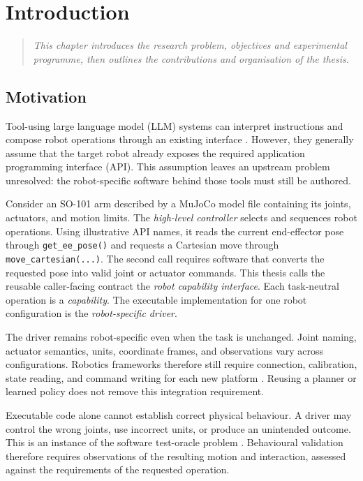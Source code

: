 \chapter[Introduction]{Introduction}\label{chapter:introduction}

\begin{quote}\itshape
This chapter introduces the research problem, objectives and experimental
programme, then outlines the contributions and organisation of the thesis.
\end{quote}

\section[Motivation]{Motivation}
\label{sec:intro-motivation}

Tool-using large language model (LLM) systems can interpret instructions and
compose robot operations through an existing interface
\citep{ahn2022saycan,liang2023codeaspolicies}. However, they generally assume
that the target robot already exposes the required application programming
interface (API). This assumption
leaves an upstream problem unresolved: the robot-specific software behind
those tools must still be authored.

Consider an SO-101 arm described by a MuJoCo model file containing its joints,
actuators, and motion limits. The \emph{high-level controller} selects and
sequences robot operations. Using illustrative API names, it reads the current
end-effector pose through \texttt{get\_ee\_pose()} and requests a Cartesian move
through \texttt{move\_cartesian(...)}. The second call requires software that
converts the requested pose into valid joint or actuator commands. This thesis
calls the reusable caller-facing contract the
\emph{robot capability interface}. Each task-neutral operation is a
\emph{capability}. The executable implementation for one robot configuration
is the \emph{robot-specific driver}.

The driver remains robot-specific even when the task is unchanged. Joint
naming, actuator semantics, units, coordinate frames, and observations vary
across configurations. Robotics frameworks therefore still require connection,
calibration, state reading, and command writing for each new platform
\citep{lerobot2026hardware,ros2control2026hardware}. Reusing a planner or learned
policy does not remove this integration requirement.

Executable code alone cannot establish correct physical behaviour. A driver
may control the wrong joints, use incorrect units, or produce an unintended
outcome. This is an instance of the software test-oracle problem
\citep{barr2015oracle,araujo2023rasreview}. Behavioural validation therefore
requires observations of the resulting motion and interaction, assessed
against the requirements of the requested operation.


